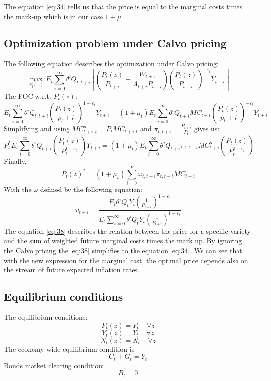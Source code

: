 \documentclass[10pt,a4paper]{article}
\begin{document}
The equation \eqref{eq:34} tells us that the price is equal to the marginal costs times the mark-up which is in our case $1+\mu$
\subsection{Optimization problem under Calvo pricing}
The following equation describes the optimization under Calvo pricing:
\begin{equation}\label{eq:35}
\max_{P_{t}(z)}E_{t}\sum_{i=0}^{\infty}
\theta^{i}Q_{t,t+i}
\left[
\left(\frac{P_{t}(z)}{P_{t+i}}-\frac{W_{t+i}}{A_{t+i}P_{t+i}}
\right)
\left(\frac{P_t(z)}{P_{t+i}}
\right)^{-\varepsilon_t}Y_{t+i}
\right]
\end{equation}
The FOC w.r.t. $P_t(z)$:
\begin{equation}
E_{t}\sum_{i=0}^{\infty}
\theta^{i} Q_{t,t+i}(\frac{P_t(z)}{p_t+i})^{1-\varepsilon_t}Y_{t+i}
=
(1+\mu_t)E_t\sum_{i=0}^{\infty}\theta^iQ_{t+i}MC_{t+i}(\frac{P_t(z)}{p_t+i})^{-\varepsilon_t}Y_{t+i}
\end{equation}
Simplifying and using $MC_{t+i,t}^n=P_tMC_{t+i,t}$ and $\pi_{t,t+i}=\frac{P_{t+i}}{P_t}$ gives us:
\begin{equation}
P_t^*E_t\sum_{i=0}^{\infty}\theta^iQ_{t+i}(\frac{P_t(z)}{P_t^{1-\varepsilon_t}}) Y_{t+i}
=
(1+\mu_t)E_t\sum_{i=0}^{\infty}\theta^iQ_{t+i}\pi_{t,t+i}MC_{t+i}^n(\frac{P_t(z)}{P_t^{1-\varepsilon_t}})
\end{equation}
Finally,
\begin{equation}\label{eq:38}
P_t(z)^*=(1+\mu_t)\sum_{i=0}^{\infty}\omega_{t,t+i}\pi_{t,t+i}MC_{t+i}
\end{equation}
With the $\omega$ defined by the following equation:
\begin{equation}
\omega_{t+i} = 
\frac{
E_t \theta^i Q_t Y_t \left(\frac{1}{P_{t+i}}\right)^{1-\varepsilon_t}
}{
E_{t}\sum_{i=0}^{\infty} \theta^i Q_t Y_t \left(\frac{1}{P_{t+i}}\right)^{1-\varepsilon_t}
}
\end{equation}
The equation \eqref{eq:38} describes the relation between the price for a specific variety and the sum of weighted future marginal costs times the mark up. By ignoring the Calvo pricing the \eqref{eq:38} simplifies to the equation \eqref{eq:34}. We can see that with the new expression for the marginal cost, the optimal price depends also on the stream of future expected inflation rates.
\subsection{Equilibrium conditions}
The equilibrium conditions:
$$P_t(z)=P_t \ \ \ \ \ \forall z$$ 
$$Y_t(z)=Y_t \ \ \ \ \ \forall z$$ 
$$N_t(z)=N_t \ \ \ \ \ \forall z$$
The economy wide equilibrium condition is:
$$C_t+G_t=Y_t$$
Bonds market clearing condition:
$$B_t=0$$
\end{document}
